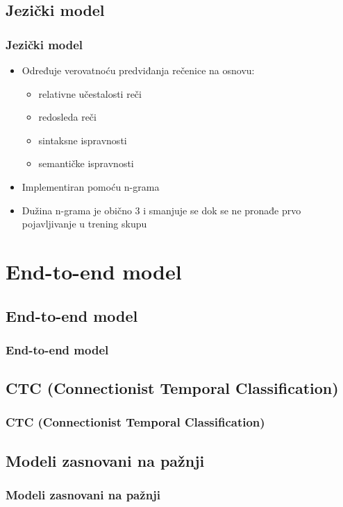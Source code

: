 \documentclass{beamer}
\begin{document}
\subsection{Jezički model}
\begin{frame}
  \frametitle{Jezički model}

  \begin{itemize}
    \item Određuje verovatnoću predviđanja rečenice na osnovu:
    \begin{itemize}
      \item relativne učestalosti reči
      \item redosleda reči
      \item sintaksne ispravnosti
      \item semantičke ispravnosti
    \end{itemize}
    \item Implementiran pomoću n-grama
    \item Dužina n-grama je obično 3 i smanjuje se dok se ne pronađe prvo pojavljivanje u trening skupu
  \end{itemize}
\end{frame}

\section{End-to-end model}

\subsection{End-to-end model}
\begin{frame}
  \frametitle{End-to-end model}
  \cite{graves2006ctc}
  \cite{chan2015las}
\end{frame}

\subsection{CTC (Connectionist Temporal Classification)}
\begin{frame}
  \frametitle{CTC (Connectionist Temporal Classification)}
\end{frame}

\subsection{Modeli zasnovani na pažnji}
\begin{frame}
  \frametitle{Modeli zasnovani na pažnji}
\end{frame}
\end{document}
